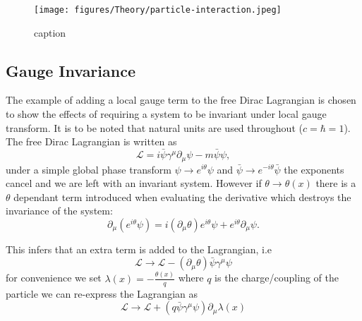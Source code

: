 \begin{figure}[htbp]
  \centering
    \texttt{[image: figures/Theory/particle-interaction.jpeg]}
  \caption{caption}
  \label{fig:figures_Theory_particle-interaction}
\end{figure}

\subsection{Gauge Invariance} %
\label{sub:gauge_invariance}
The example of adding a local gauge term to the free Dirac Lagrangian is chosen to show the effects of requiring a system to be invariant under local gauge transform. It is to be noted that natural units are used throughout ($c = \hbar = 1$). The free Dirac Lagrangian is written as
\begin{equation}
  \mathcal{L} = i\bar{\psi}\gamma^{\mu}\partial_{\mu}\psi - m\bar{\psi}\psi,
  \label{eq:freeDiracL}
\end{equation}
under a simple global phase transform $\psi\rightarrow e^{i\theta}\psi$ and $\bar{\psi}\rightarrow e^{-i\theta}\bar{\psi}$ the exponents cancel and we are left with an invariant system. However if $\theta\rightarrow\theta (x)$ there is a $\theta$ dependant term introduced when evaluating the derivative which destroys the invariance of the system:
\begin{equation}
  \partial_{\mu}\left(e^{i\theta}\psi\right) = i\left(\partial_{\mu}\theta\right)e^{i\theta}\psi + e^{i\theta}\partial_{\mu}\psi.
\end{equation} 

This infers that an extra term is added to the Lagrangian, i.e
\begin{equation}
  \mathcal{L}\rightarrow\mathcal{L}-\left(\partial_{\mu}\theta\right)\bar{\psi}\gamma^{\mu}\psi
\end{equation}
for convenience we set $\lambda(x) = -\frac{\theta(x)}{q}$ where $q$ is the charge/coupling of the particle we can re-express the Lagrangian as
\begin{equation}  \mathcal{L} \rightarrow \mathcal{L} + \left( q\bar{\psi}\gamma^{\mu} \psi \right) \partial_{\mu} \lambda(x)
  \label{eq:diracLplusLambda}
\end{equation}

